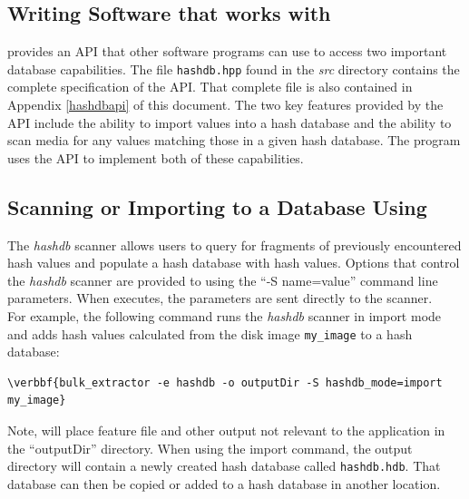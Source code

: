 \documentclass[11pt,fleqn]{article} %
\begin{document}
\subsection{Writing Software that works with \hash}
\label{APISection}
\hash provides an API that other software programs can use to access two important database capabilities. The file \texttt{hashdb.hpp} found in the \textit{src} directory contains the complete specification of the API. That complete file is also contained in Appendix \ref{hashdbapi} of this document.  The two key features provided by the API include the ability to import values into a hash database and the ability to scan media for any values matching those in a given hash database.  The \bulk program uses the \hash API to implement both of these capabilities.\\

\subsection{Scanning or Importing to a Database Using \bulk}
\label{bulkextractorSection}
The \bulk \textit{hashdb} scanner allows users to query for fragments of previously encountered hash values and populate a hash database with hash values. Options that control the \textit{hashdb} scanner are provided to \bulk using the ``-S name=value'' command line parameters. When \bulk executes, the parameters are sent directly to the scanner.\\

For example, the following command runs the \bulk \textit{hashdb} scanner in import mode and adds hash values calculated from the disk image \texttt{my\_image} to a hash database:
\begin{Verbatim}[commandchars=\\\{\}]
\verbbf{bulk_extractor -e hashdb -o outputDir -S hashdb_mode=import my_image}
\end{Verbatim}
Note, \bulk will place feature file and other output not relevant to the \hash application in the ``outputDir'' directory. When using the import command, the output directory will contain a newly created hash database called \texttt{hashdb.hdb}. That database can then be copied or added to a hash database in another location.
\end{document}
